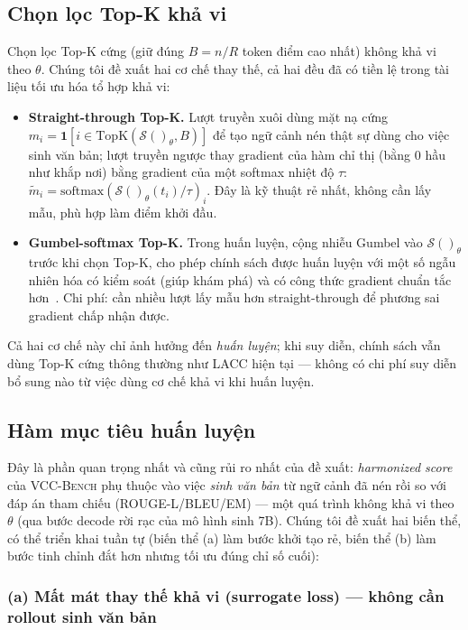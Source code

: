 \documentclass[12pt,a4paper]{article}
\newcommand{\score}[1]{\mathcal{S}(#1)}      %
\newcommand{\method}[1]{\textsc{#1}}         %
\begin{document}
\subsection{Chọn lọc Top-K khả vi}

Chọn lọc Top-K cứng (giữ đúng $B = n/R$ token điểm cao nhất) không khả vi theo $\theta$. Chúng tôi đề xuất hai cơ chế thay thế, cả hai đều đã có tiền lệ trong tài liệu tối ưu hóa tổ hợp khả vi:

\begin{itemize}
    \item \textbf{Straight-through Top-K.} Lượt truyền xuôi dùng mặt nạ cứng $m_i = \mathbf{1}[i \in \text{TopK}(\score{}_\theta, B)]$ để tạo ngữ cảnh nén thật sự dùng cho việc sinh văn bản; lượt truyền ngược thay gradient của hàm chỉ thị (bằng 0 hầu như khắp nơi) bằng gradient của một softmax nhiệt độ $\tau$: $\tilde{m}_i = \text{softmax}(\score{}_\theta(t_i)/\tau)_i$. Đây là kỹ thuật rẻ nhất, không cần lấy mẫu, phù hợp làm điểm khởi đầu.
    \item \textbf{Gumbel-softmax Top-K.} Trong huấn luyện, cộng nhiễu Gumbel vào $\score{}_\theta$ trước khi chọn Top-K, cho phép chính sách được huấn luyện với một số ngẫu nhiên hóa có kiểm soát (giúp khám phá) và có công thức gradient chuẩn tắc hơn~\cite{jang2017gumbel}. Chi phí: cần nhiều lượt lấy mẫu hơn straight-through để phương sai gradient chấp nhận được.
\end{itemize}

Cả hai cơ chế này chỉ ảnh hưởng đến \emph{huấn luyện}; khi suy diễn, chính sách vẫn dùng Top-K cứng thông thường như \method{LACC} hiện tại --- không có chi phí suy diễn bổ sung nào từ việc dùng cơ chế khả vi khi huấn luyện.

\subsection{Hàm mục tiêu huấn luyện}

Đây là phần quan trọng nhất và cũng rủi ro nhất của đề xuất: \textit{harmonized score} của \method{VCC-Bench} phụ thuộc vào việc \emph{sinh văn bản} từ ngữ cảnh đã nén rồi so với đáp án tham chiếu (ROUGE-L/BLEU/EM) --- một quá trình không khả vi theo $\theta$ (qua bước decode rời rạc của mô hình sinh 7B). Chúng tôi đề xuất hai biến thể, có thể triển khai tuần tự (biến thể (a) làm bước khởi tạo rẻ, biến thể (b) làm bước tinh chỉnh đắt hơn nhưng tối ưu đúng chỉ số cuối):

\subsubsection{(a) Mất mát thay thế khả vi (surrogate loss) --- không cần rollout sinh văn bản}
\end{document}
